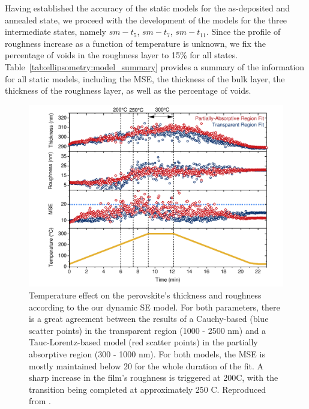 Having established the accuracy of the static models for the as-deposited and annealed state, we proceed with the development of the models for the three intermediate states, namely $sm-t_5$, $sm-t_7$, $sm-t_{\text{11}}$. Since the profile of roughness increase as a function of temperature is unknown, we fix the percentage of voids in the roughness layer to 15\% for all states. Table~\ref{tab:ellipsometry:model_summary} provides a summary of the information for all static models, including the MSE, the thickness of the bulk layer, the thickness of the roughness layer, as well as the percentage of voids.


\begin{figure}[htbp]
  \centering
  \medskip
  \includegraphics[width=.99\textwidth]{chapters/ellipsometry/image/Roughness_Thickness.pdf}
  \caption[Temperature effect on the perovskite's thickness and roughness according to the our dynamic SE model.]{Temperature effect on the perovskite's thickness and roughness according to the our dynamic SE model. For both parameters, there is a great agreement between the results of a Cauchy-based  (blue scatter points) in the transparent region (1000 - 2500 nm) and a Tauc-Lorentz-based model (red scatter points) in the partially absorptive region (300 - 1000 nm). For both models, the MSE is mostly maintained below 20 for the whole duration of the fit. A sharp increase in the film's roughness is triggered at 200\degree C, with the transition being completed at approximately 250 \degree C. Reproduced from \cite{Papadopoulou2024InEllipsometry}.}
  \label{fig:ellipsometry:roughness_thickness}
\end{figure}


